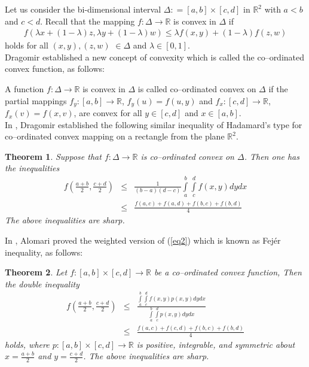 \documentclass{amsart}
\newtheorem{theorem}{Theorem}
\theoremstyle{plain}
\numberwithin{equation}{section}
\begin{document}
Let us consider the bi-dimensional interval $  \Delta : = \left[
{a,b} \right] \times \left[ {c,d} \right]  $ in $ \mathbb{R}^2 $
with $a < b$ and $c < d$. Recall that the mapping $ f:\Delta \to
\mathbb{R} $ is convex in $\Delta$ if
\begin{eqnarray*}
f\left( {\lambda x + \left( {1 - \lambda } \right)z,\lambda y +
\left( {1 - \lambda } \right)w} \right) \le \lambda f\left( {x,y}
\right) + \left( {1 - \lambda } \right)f\left( {z,w} \right)
\end{eqnarray*}
holds for all $(x,y), (z, w)$ $\in \Delta$ and $\lambda \in \left[
{0,1} \right]$.\\

Dragomir \cite{Dragomir2} established a new concept of convexity
which is called the co--ordinated convex function, as follows:

A function $ f:\Delta \to \mathbb{R} $ is convex in $\Delta$ is
called co--ordinated convex on $\Delta$ if the partial mappings $
f_y :\left[ {a,b} \right] \to \mathbb{R} $, $ f_y \left( u \right)
= f\left( {u,y} \right)$ and $ f_x :\left[ {c,d} \right] \to
\mathbb{R} $, $ f_x \left( v \right) = f\left( {x,v} \right)$, are
convex for all $ y \in \left[ {c,d} \right] $ and $ x \in \left[
{a,b} \right] $.\\

In \cite{Dragomir2}, Dragomir established the following similar
inequality of Hadamard's type for co--ordinated convex mapping on
a rectangle from the plane $\mathbb{R}^2 $.
\begin{theorem}\label{thm1}
Suppose that $ f:\Delta \to \mathbb{R} $ is co--ordinated convex
on $\Delta$. Then one has the inequalities
\begin{eqnarray}
\label{eq2}f\left( {\frac{{a + b}}{2},\frac{{c + d}}{2}}
\right)&\le& \frac{1}{{\left( {b - a} \right)\left( {d - c}
\right)}}\int\limits_a^b {\int\limits_c^d {f\left( {x,y}
\right)dydx} }\nonumber\\
&\le& \frac{{f\left( {a,c} \right) + f\left( {a,d} \right) +
f\left( {b,c} \right) + f\left( {b,d} \right)}}{4}
\end{eqnarray}
The above inequalities are sharp.
\end{theorem}
In \cite{alomari}, Alomari proved the weighted version of
(\ref{eq2}) which is known as Fej\'{e}r inequality, as follows:
\begin{theorem}
Let $f: [a,b] \times [c,d] \to \mathbb{R}$ be a co--ordinated
convex function, Then the double inequality
\begin{eqnarray}
f\left( {\frac{{a + b}}{2},\frac{{c + d}}{2}} \right) &\le&
\frac{{\int\limits_a^b {\int\limits_c^d {f\left( {x,y}
\right)p\left( {x,y} \right)dydx} } }}{{\int\limits_a^b
{\int\limits_c^d {p\left( {x,y} \right)dydx} } }}
\\
&\le& \frac{{f\left( {a,c} \right) + f\left( {c,d} \right) +
f\left( {b,c} \right) + f\left( {b,d} \right)}}{4}\nonumber
\end{eqnarray}
holds, where $p:\left[ {a,b} \right] \times \left[ {c,d} \right]
\to \mathbb{R}$ is positive, integrable, and symmetric about $x =
\frac{{a + b}}{2}$ and $y = \frac{{c + d}}{2}$. The above
inequalities are sharp.
\end{theorem}
\end{document}
